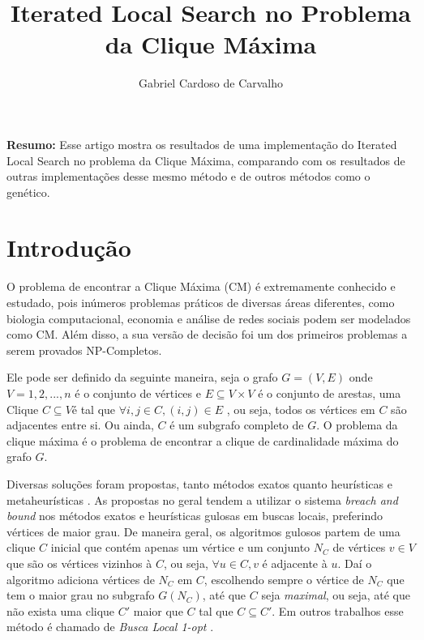 \documentclass{article}
\title{Iterated Local Search no Problema da Clique Máxima}
\author{Gabriel Cardoso de Carvalho}
\date{}
\begin{document}
\maketitle

\textbf{Resumo:} Esse artigo mostra os resultados de uma implementação do Iterated Local Search no problema da Clique Máxima, comparando com os resultados de outras implementações desse mesmo método e de outros métodos como o genético.

\section{Introdução}

O problema de encontrar a Clique Máxima (CM) é extremamente conhecido e estudado, pois inúmeros problemas práticos de diversas áreas diferentes, como biologia computacional, economia e análise de redes sociais podem ser modelados como CM. 
Além disso, a sua versão de decisão foi um dos primeiros problemas a serem provados NP-Completos.\par 

Ele pode ser definido da seguinte maneira, seja o grafo $G=(V,E)$ onde $V = 1,2, ... , n$ é o conjunto de vértices e $E \subseteq V \times V$ é o conjunto de arestas, uma Clique $C \subseteq V $é tal que $\forall i,j \in C, (i,j) \in E$ 
, ou seja, todos os vértices em $C$ são adjacentes entre si. Ou ainda, $C$ é um subgrafo completo de $G$. O problema da clique máxima é o problema de encontrar a clique de cardinalidade máxima do grafo $G$.\par

Diversas soluções foram propostas, tanto métodos exatos quanto heurísticas e metaheurísticas \cite{review,pardaloshand,DIMACS2}. As propostas no geral tendem a utilizar o sistema \textit{breach and bound} nos métodos exatos e heurísticas gulosas em buscas locais, preferindo vértices de maior grau. De maneira geral, os algoritmos gulosos partem de uma clique $C$ inicial que contém apenas um vértice e um conjunto $N_C$ de vértices $v \in V$ que são os vértices vizinhos à $C$, ou seja, $\forall u \in C, v$ é adjacente à $u$. Daí o algoritmo adiciona vértices de  $N_C$ em $C$, escolhendo sempre o vértice de $N_C$ que tem o maior grau no subgrafo $G(N_C)$, até que $C$ seja \textit{maximal}, ou seja, até que não exista uma clique $C'$ maior que $C$ tal que $C \subseteq C'$. Em outros trabalhos esse método é chamado de \textit{Busca Local 1-opt } \cite{KLS}.\par
\end{document}
